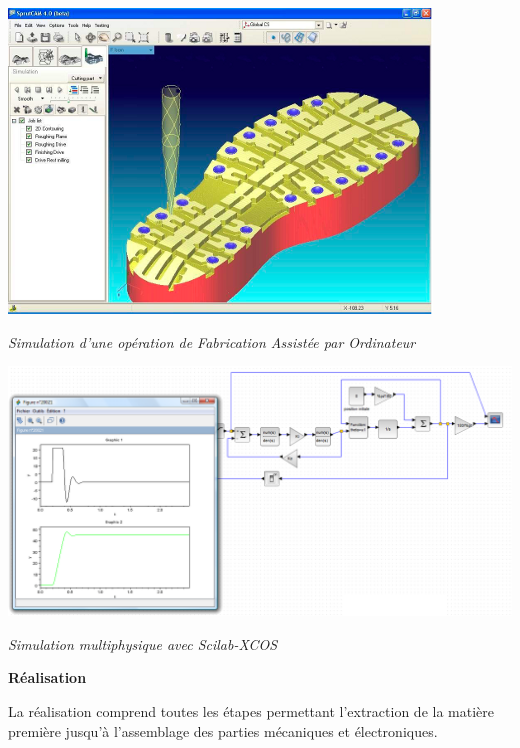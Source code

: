 \documentclass[11pt,oneside]{article}
\begin{document}
\begin{exemple}
\noindent\begin{minipage}[c]{.35\linewidth}
\begin{center}
\includegraphics[width=\textwidth]{png/FAO_p}

\textit{Simulation d'une opération de Fabrication Assistée par Ordinateur}\cite{fao}
\end{center}
\end{minipage} \hfill
\begin{minipage}[c]{.55\linewidth}
\begin{center}
\includegraphics[width=\textwidth]{png/scilab}

\textit{Simulation multiphysique avec Scilab-XCOS}\cite{scilab}
\end{center}
\end{minipage} 
\end{exemple}

\begin{defi}
\textbf{Réalisation}

La réalisation comprend toutes les étapes permettant l'extraction de la matière première jusqu'à l'assemblage des parties mécaniques et électroniques. 
\end{defi}
\end{document}
